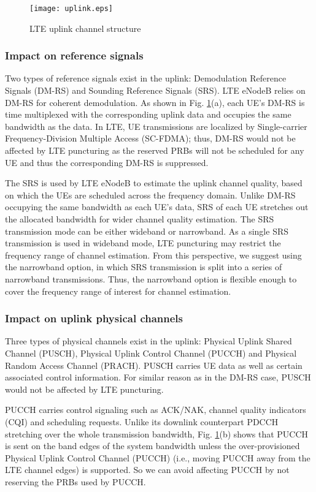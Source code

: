 \documentclass[10pt,journal]{IEEEtran}
\theoremstyle{slplain}
\begin{document}
 \begin{figure}
 \centering
 \texttt{[image: uplink.eps]}
 \caption{LTE uplink channel structure}
 \label{fig:uplink}
 \end{figure}

\subsubsection{Impact on reference signals} 

Two types of reference signals exist in the uplink: Demodulation Reference Signals (DM-RS) and Sounding Reference Signals (SRS). LTE eNodeB relies on DM-RS for coherent demodulation. As shown in Fig. \ref{fig:uplink}(a), each UE's DM-RS is time multiplexed with the corresponding uplink data and occupies the same bandwidth as the data. In LTE, UE transmissions are localized by Single-carrier Frequency-Division Multiple Access (SC-FDMA); thus, DM-RS would not be affected by LTE puncturing as the reserved PRBs will not be scheduled for any UE and thus the corresponding DM-RS is suppressed.

The SRS is used by LTE eNodeB to estimate the uplink channel quality, based on which the UEs are scheduled across the frequency domain. Unlike DM-RS occupying the same bandwidth as each UE's data, SRS of each UE stretches out the allocated bandwidth for wider channel quality estimation. The SRS transmission mode can be either wideband or narrowband. As a single SRS transmission is used in wideband mode, LTE puncturing may restrict the frequency range of channel estimation. From this perspective, we suggest using the narrowband option, in which SRS transmission is split into a series of narrowband transmissions. Thus, the narrowband option is flexible enough to cover the frequency range of interest for channel estimation.



\subsubsection{Impact on uplink physical channels} 

Three types of physical channels exist in the uplink: Physical Uplink Shared Channel (PUSCH), Physical Uplink Control Channel (PUCCH) and Physical Random Access Channel (PRACH). PUSCH carries UE data as well as certain associated control information. For similar reason as in the DM-RS case, PUSCH would not be affected by LTE puncturing.


PUCCH carries control signaling such as ACK/NAK, channel quality indicators (CQI) and scheduling requests. Unlike its downlink counterpart PDCCH stretching over the whole transmission bandwidth, Fig. \ref{fig:uplink}(b) shows that PUCCH is sent on the band edges of the system bandwidth unless the over-provisioned Physical Uplink Control Channel (PUCCH) (i.e., moving PUCCH away from the LTE channel edges) is supported. So we can avoid affecting PUCCH by not reserving the PRBs used by PUCCH.
\end{document}
